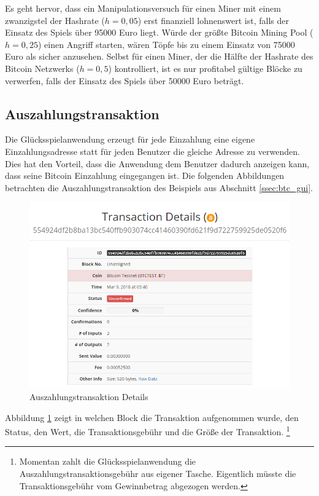 Es geht hervor, dass ein Manipulationsversuch für einen Miner mit einem zwanzigstel der Hashrate ($h=0,05$) erst finanziell lohnenswert ist, falls der Einsatz des Spiels über 95000 Euro liegt. Würde der größte Bitcoin Mining Pool ($h=0,25$) einen Angriff starten, wären Töpfe bis zu einem Einsatz von 75000 Euro als sicher anzusehen. Selbst für einen Miner, der die Hälfte der Hashrate des Bitcoin Netzwerks ($h=0,5$) kontrolliert, ist es nur profitabel gültige Blöcke zu verwerfen, falls der Einsatz des Spiels über 50000 Euro beträgt.

\subsection{Auszahlungstransaktion} \label{sssec:Auszahlungstransaktion}
Die Glücksspielanwendung erzeugt für jede Einzahlung eine eigene Einzahlungsadresse statt für jeden Benutzer die gleiche Adresse zu verwenden. Dies hat den Vorteil, dass die Anwendung dem Benutzer dadurch anzeigen kann, dass seine Bitcoin Einzahlung eingegangen ist. Die folgenden Abbildungen betrachten die Auszahlungstransaktion des Beispiels aus Abschnitt \ref{ssec:btc_gui}.

\begin{figure}[H]
\centering
\includegraphics[width=1\linewidth]{Figures/btc_gui/btc_txn}
\decoRule
\caption{Auszahlungstransaktion Details}
\label{fig:btc_txn}
\end{figure}

\noindent Abbildung \ref{fig:btc_txn} zeigt in welchen Block die Transaktion aufgenommen wurde, den Status, den Wert, die Transaktionsgebühr und die Größe der Transaktion.
\footnote{Momentan zahlt die Glücksspielanwendung die Auszahlungstransaktionsgebühr aus eigener Tasche. Eigentlich müsste die Transaktionsgebühr vom Gewinnbetrag abgezogen werden.}

